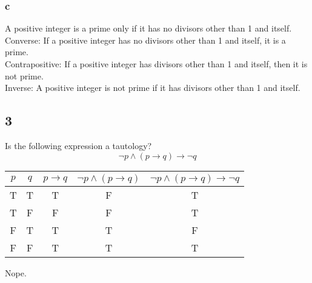 \documentclass[letterpaper, 12pt]{math}
\begin{document}
\subsubsection*{c}
A positive integer is a prime only if it has no divisors other than 1 and
itself. \\
Converse: If a positive integer has no divisors other than 1 and itself, it is
a prime. \\
Contrapositive: If a positive integer has divisors other than 1 and itself,
then it is not prime. \\
Inverse: A positive integer is not prime if it has divisors other than 1 and
itself.

\subsection*{3}
Is the following expression a tautology?
\[ \neg{p} \wedge (p \to q) \to \neg{q} \]
\begin{center}
  \begin{tabular}{|c|c|c|c|c|}
    \hline
    \( p \) & \( q \) & \( p \to q \) & \( \neg{p} \wedge (p \to q) \) &
    \( \neg{p} \wedge (p \to q) \to \neg{q} \) \\ \hline
    T & T & T & F & T \\ \hline
    T & F & F & F & T \\ \hline
    F & T & T & T & F \\ \hline
    F & F & T & T & T \\ \hline
  \end{tabular}
\end{center}
Nope.
\end{document}
